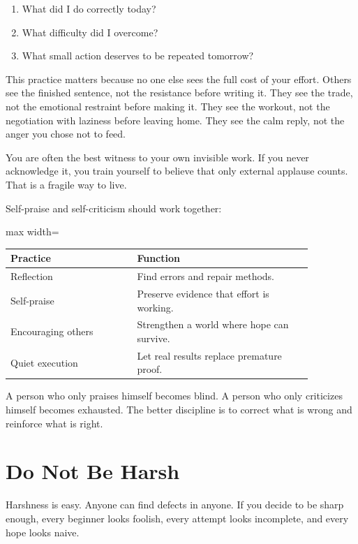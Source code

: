 \begin{enumerate}
\item What did I do correctly today?
\item What difficulty did I overcome?
\item What small action deserves to be repeated tomorrow?
\end{enumerate}

This practice matters because no one else sees the full cost of your effort. Others see the finished sentence, not the resistance before writing it. They see the trade, not the emotional restraint before making it. They see the workout, not the negotiation with laziness before leaving home. They see the calm reply, not the anger you chose not to feed.

You are often the best witness to your own invisible work. If you never acknowledge it, you train yourself to believe that only external applause counts. That is a fragile way to live.

Self-praise and self-criticism should work together:

\begin{center}
\begin{adjustbox}{max width=\linewidth}
\begin{tabular}{p{0.36\linewidth}p{0.5\linewidth}}
\hline
Practice & Function \\
\hline
Reflection & Find errors and repair methods. \\
Self-praise & Preserve evidence that effort is working. \\
Encouraging others & Strengthen a world where hope can survive. \\
Quiet execution & Let real results replace premature proof. \\
\hline
\end{tabular}
\end{adjustbox}
\end{center}

A person who only praises himself becomes blind. A person who only criticizes himself becomes exhausted. The better discipline is to correct what is wrong and reinforce what is right.

\section*{Do Not Be Harsh}

Harshness is easy. Anyone can find defects in anyone. If you decide to be sharp enough, every beginner looks foolish, every attempt looks incomplete, and every hope looks naive.

